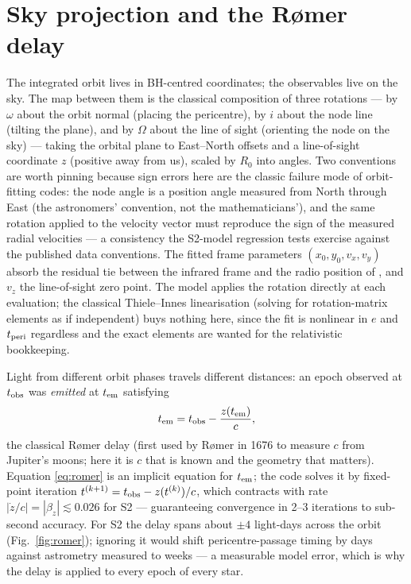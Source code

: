 \section{Sky projection and the R{\o}mer delay}
\label{sec:romer}

The integrated orbit lives in BH-centred coordinates; the observables
live on the sky. The map between them is the classical composition of
three rotations — by $\omega$ about the orbit normal (placing the
pericentre), by $i$ about the node line (tilting the plane), and by
$\Omega$ about the line of sight (orienting the node on the sky) —
taking the orbital plane to East--North offsets and a line-of-sight
coordinate $z$ (positive away from us), scaled by $R_0$ into angles.
Two conventions are worth pinning because sign errors here are the
classic failure mode of orbit-fitting codes: the node angle is a
position angle measured from North through East (the astronomers'
convention, not the mathematicians'), and the same rotation applied to
the velocity vector must reproduce the sign of the measured radial
velocities — a consistency the S2-model regression tests exercise
against the published data conventions. The fitted frame parameters
$(x_0, y_0, v_x, v_y)$ absorb the residual tie between the
infrared frame and the radio position of \sgra{} \citep{Plewa2015},
and $v_z$ the line-of-sight zero point. The model applies the
rotation directly at each evaluation; the classical Thiele--Innes
linearisation (solving for rotation-matrix elements as if independent)
buys nothing here, since the fit is nonlinear in $e$ and
$t_{\rm peri}$ regardless and the exact elements are wanted for the
relativistic bookkeeping.

Light from different orbit phases travels different distances: an epoch
observed at $t_{\rm obs}$ was \emph{emitted} at $t_{\rm em}$ satisfying
\begin{equation}
t_{\rm em} = t_{\rm obs} - \frac{z(t_{\rm em})}{c},
\label{eq:romer}
\end{equation}
the classical R{\o}mer delay (first used by R{\o}mer in 1676 to measure
$c$ from Jupiter's moons; here it is $c$ that is known and the geometry
that matters). Equation \eqref{eq:romer} is an implicit equation for
$t_{\rm em}$; the code solves it by fixed-point iteration
$t^{(k+1)} = t_{\rm obs} - z(t^{(k)})/c$, which contracts with rate
$|\dot z/c| = |\beta_z| \lesssim 0.026$ for S2 — guaranteeing
convergence in 2--3 iterations to sub-second accuracy. For S2 the delay
spans about $\pm 4$ light-days across the orbit
(Fig.~\ref{fig:romer}); ignoring it would shift pericentre-passage
timing by days against astrometry measured to weeks — a measurable
model error, which is why the delay is applied to every epoch of every
star.


